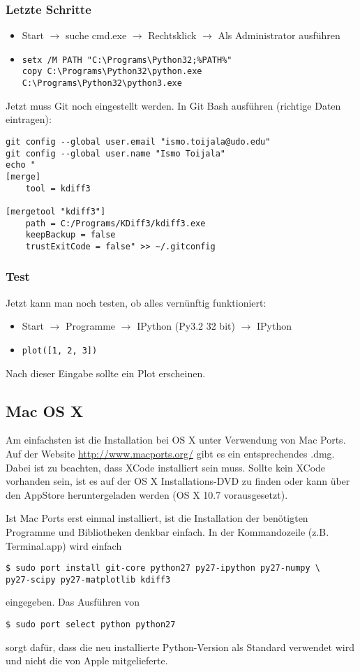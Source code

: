 \subsubsection{Letzte Schritte}
\begin{itemize}
  \item Start $\rightarrow$ suche cmd.exe $\rightarrow$ Rechtsklick $\rightarrow$ Als Administrator ausführen
  \item
\begin{verbatim}
setx /M PATH "C:\Programs\Python32;%PATH%"
copy C:\Programs\Python32\python.exe C:\Programs\Python32\python3.exe
\end{verbatim}
\end{itemize}
Jetzt muss Git noch eingestellt werden.
In Git Bash ausführen (richtige Daten eintragen):
\begin{verbatim}
git config --global user.email "ismo.toijala@udo.edu"
git config --global user.name "Ismo Toijala"
echo "
[merge]
    tool = kdiff3
    
[mergetool "kdiff3"]
    path = C:/Programs/KDiff3/kdiff3.exe
    keepBackup = false
    trustExitCode = false" >> ~/.gitconfig
\end{verbatim}

\subsubsection{Test}
Jetzt kann man noch testen, ob alles vernünftig funktioniert:
\begin{itemize}
  \item Start $\rightarrow$ Programme $\rightarrow$ IPython (Py3.2 32 bit) $\rightarrow$ IPython
  \item \texttt{plot([1, 2, 3])}
\end{itemize}
Nach dieser Eingabe sollte ein Plot erscheinen.

\subsection{Mac OS X}
Am einfachsten ist die Installation bei OS X unter Verwendung von Mac Ports.
Auf der Website \url{http://www.macports.org/} gibt es ein entsprechendes .dmg.
Dabei ist zu beachten, dass XCode installiert sein muss. Sollte kein XCode vorhanden sein, ist es auf der OS X Installations-DVD zu finden oder kann über den AppStore heruntergeladen werden (OS X 10.7 vorausgesetzt).

Ist Mac Ports erst einmal installiert, ist die Installation der benötigten Programme und Bibliotheken denkbar einfach. In der Kommandozeile (z.B. Terminal.app) wird einfach
\begin{verbatim}
$ sudo port install git-core python27 py27-ipython py27-numpy \
py27-scipy py27-matplotlib kdiff3
\end{verbatim}
eingegeben.
Das Ausführen von
\begin{verbatim}
$ sudo port select python python27
\end{verbatim}
sorgt dafür, dass die neu installierte Python-Version als Standard verwendet wird und nicht die von Apple mitgelieferte.

